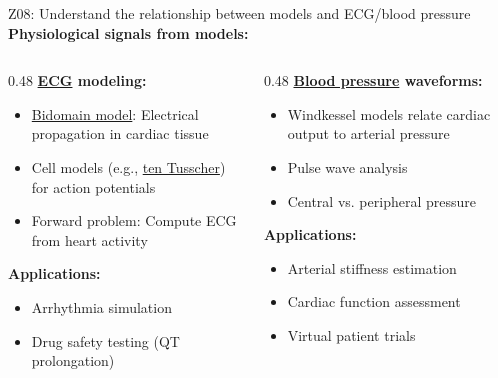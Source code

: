 \documentclass[aspectratio=169, 10pt]{beamer}
\begin{document}
\begin{frame}{Z08: Understand the relationship between models and ECG/blood pressure}
    \textbf{Physiological signals from models:}
    
    \vspace{0.2cm}
    \begin{columns}[T]
        \begin{column}{0.48\textwidth}
            \textbf{\href{https://en.wikipedia.org/wiki/Electrocardiography}{ECG} modeling:}
            \begin{itemize}
                \item \href{https://en.wikipedia.org/wiki/Bidomain_model}{Bidomain model}: Electrical propagation in cardiac tissue
                \item Cell models (e.g., \href{https://models.physiomeproject.org/exposure/a7179d94365ff0c9c0e6eb7c6a787d3d}{ten Tusscher}) for action potentials
                \item Forward problem: Compute ECG from heart activity
            \end{itemize}
            
            \vspace{0.2cm}
            \textbf{Applications:}
            \begin{itemize}
                \item Arrhythmia simulation
                \item Drug safety testing (QT prolongation)
            \end{itemize}
        \end{column}
        \begin{column}{0.48\textwidth}
            \textbf{\href{https://en.wikipedia.org/wiki/Blood_pressure}{Blood pressure} waveforms:}
            \begin{itemize}
                \item Windkessel models relate cardiac output to arterial pressure
                \item Pulse wave analysis
                \item Central vs. peripheral pressure
            \end{itemize}
            
            \vspace{0.2cm}
            \textbf{Applications:}
            \begin{itemize}
                \item Arterial stiffness estimation
                \item Cardiac function assessment
                \item Virtual patient trials
            \end{itemize}
        \end{column}
    \end{columns}
    

\end{frame}
\end{document}
